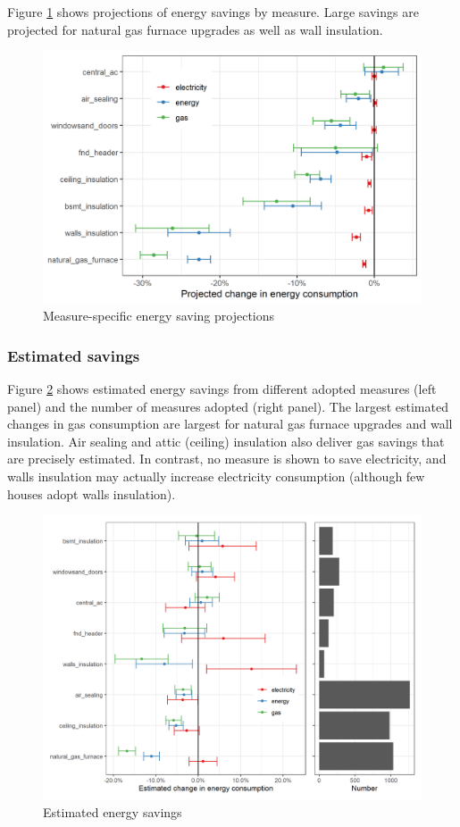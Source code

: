 \documentclass{article}
\begin{document}
Figure \ref{fig_mbm_proj} shows projections of energy savings by measure. Large savings are projected for natural gas furnace upgrades as well as wall insulation.

\begin{figure}
	\includegraphics{../output_figures_tables/projected_es_mbm.png}
	\caption{Measure-specific energy saving projections}\label{fig_mbm_proj}
\end{figure}


\subsubsection{Estimated savings}

Figure \ref{fig_proj} shows estimated energy savings from different adopted measures (left panel) and the number of measures adopted (right panel). The largest estimated changes in gas consumption are largest for natural gas furnace upgrades and wall insulation. Air sealing and attic (ceiling) insulation also deliver gas savings that are precisely estimated. In contrast, no measure is shown to save electricity, and walls insulation may actually increase electricity consumption (although few houses adopt walls insulation).

\begin{figure}
	\includegraphics[width=\linewidth]{../output_figures_tables/mbm_energy_savings_combined.png}
	\caption{Estimated energy savings}\label{fig_proj}
\end{figure}
\end{document}
